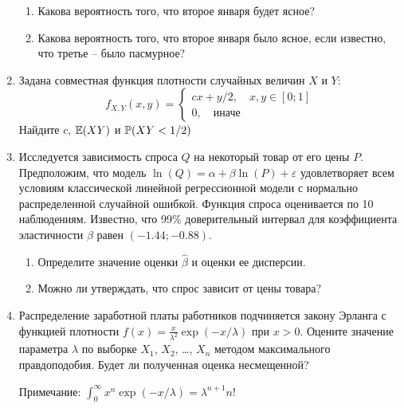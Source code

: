 \documentclass[pdftex,12pt,a4paper]{article}
\begin{document}
\begin{enumerate}
\begin{enumerate}
\item Какова вероятность того, что второе января будет ясное?
\item Какова вероятность того, что второе января было ясное, если известно, что третье -- было пасмурное?
\end{enumerate}
\item Задана совместная функция плотности случайных величин $X$ и $Y$:
\begin{equation}
f_{X,Y}(x,y)=\left\{\begin{array}{c}
cx+y/2,\quad x,y\in [0;1] \\ 
0,\quad \text{иначе}
\end{array}  \right.
\end{equation}
Найдите $c$, $\E(XY)$ и $\P(XY<1/2)$
\item Исследуется зависимость спроса $Q$ на некоторый товар от его цены $P$. Предположим, что модель $\ln(Q)=\alpha+\beta\ln(P)+\varepsilon$ удовлетворяет всем условиям классической линейной регрессионной модели с нормально распределенной случайной ошибкой. Функция спроса оценивается по 10 наблюдениям. Известно, что 99\% доверительный интервал для коэффициента эластичности $\beta$ равен $(-1.44;-0.88)$.
\begin{enumerate}
\item Определите значение оценки $\hat{\beta}$ и оценки ее дисперсии.
\item Можно ли утверждать, что спрос зависит от цены товара?
\end{enumerate}
\item Распределение заработной платы работников подчиняется закону Эрланга с функцией плотности $f(x)=\frac{x}{\lambda^2}\exp(-x/\lambda)$ при $x>0$. Оцените значение параметра $\lambda$ по выборке $X_1$, $X_2$, \ldots, $X_n$ методом максимального правдоподобия. Будет ли полученная оценка несмещенной?

Примечание: $\int_0^{\infty} x^n \exp(-x/\lambda)=\lambda^{n+1}n!$
\end{enumerate}
\end{document}
